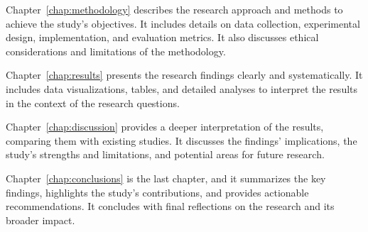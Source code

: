 Chapter~\ref{chap:methodology} describes the research approach and methods to achieve the study's objectives. It includes details on data collection, experimental design, implementation, and evaluation metrics. It also discusses ethical considerations and limitations of the methodology.

Chapter~\ref{chap:results} presents the research findings clearly and systematically. It includes data visualizations, tables, and detailed analyses to interpret the results in the context of the research questions.

Chapter~\ref{chap:discussion} provides a deeper interpretation of the results, comparing them with existing studies. It discusses the findings' implications, the study's strengths and limitations, and potential areas for future research.

Chapter~\ref{chap:conclusions} is the last chapter, and it summarizes the key findings, highlights the study's contributions, and provides actionable recommendations. It concludes with final reflections on the research and its broader impact.
